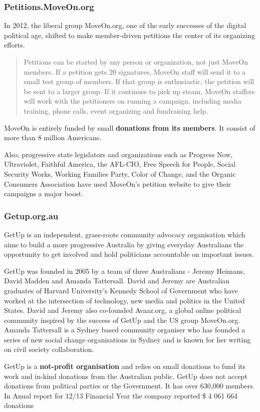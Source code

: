 \subsubsection*{Petitions.MoveOn.org}
In 2012, the liberal group MoveOn.org, one of the early successes of the digital political age, shifted to make member-driven petitions the center of its organizing efforts.\citep{Weiner2013}
\begin{quote}
Petitions can be started by any person or organization, not just MoveOn members. If a petition gets 20 signatures, MoveOn staff will send it to a small test group of members. If that group is enthusiastic, the petition will be sent to a larger group. If it continues to pick up steam, MoveOn staffers will work with the petitioners on running a campaign, including media training, phone calls, event organizing and fundraising help.
\citep{Weiner2013}
\end{quote}
MoveOn is entirely funded by small \textbf{donations from its members}. It consist of more than 8 million Americans.
\par\vspace{0.2cm}
Also, progressive state legislators and organizations such as Progress Now, Ultraviolet, Faithful America, the AFL-CIO, Free Speech for People, Social Security Works, Working Families Party, Color of Change, and the Organic Consumers Association have used MoveOn's petition website to give their campaigns a major boost.

\subsubsection*{Getup.org.au}
GetUp is an independent, grass-roots community advocacy organisation which aims to build a more progressive Australia by giving everyday Australians the opportunity to get involved and hold politicians accountable on important issues\citep{getup2014a}.
\par\vspace{0.2cm}
GetUp was founded in 2005 by a team of three Australians - Jeremy Heimans, David Madden and Amanda Tattersall. David and Jeremy are Australian graduates of Harvard University's Kennedy School of Government who have worked at the intersection of technology, new media and politics in the United States. David and Jeremy also co-founded Avaaz.org, a global online political community inspired by the success of GetUp and the US group MoveOn.org. Amanda Tattersall is a Sydney based community organiser who has founded a series of new social change organisations in Sydney and is known for her writing on civil society collaboration\citep{getup2014b}. 
\par\vspace{0.2cm}
GetUp is a \textbf{not-profit organisation} and relies on small donations to fund its work and in-kind donations from the Australian public. GetUp does not accept donations from political parties or the Government. It has over 630,000 members. In Anual report for 12/13 Financial Year the company reported \$ 4 061 664 donations \citep{getup2013}

